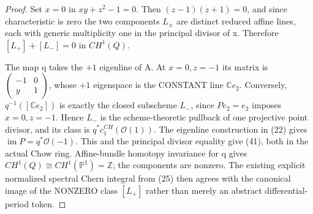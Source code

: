 \documentclass[11pt]{article}
\begin{document}
\begin{proof}
Set $x=0$ in $xy+z^2-1=0$.
Then $(z-1)(z+1)=0$, and since characteristic
is zero the two components $L_\pm$ are distinct
reduced affine lines, each with generic
multiplicity one in the principal divisor
of x. Therefore $[L_+]+[L_-]=0$
in $CH^1(Q)$.

The map q takes the $+1$ eigenline of A.
At $x=0,z=-1$ its matrix is
$\begin{pmatrix}-1&0\\y&1\end{pmatrix}$,
whose $+1$ eigenspace is the CONSTANT line
$\mathbb C e_2$. Conversely,
$q^{-1}([\mathbb C e_2])$ is exactly the
closed subscheme $L_-$, since
$P e_2=e_2$ imposes $x=0,z=-1$.
Hence $L_-$ is the scheme-theoretic
pullback of one projective point divisor,
and its class is $q^*c_1^{CH}(\mathcal O(1))$.
The eigenline construction in (22) gives
$\operatorname{im}P=q^*\mathcal O(-1)$.
This and the principal divisor equality
give (41), both in the actual Chow ring.
Affine-bundle homotopy invariance for q
gives $CH^1(Q)\cong CH^1(\mathbb P^1)
=\mathbb Z$; the components are nonzero.
The existing explicit normalized spectral
Chern integral from (25) then agrees with
the canonical image of the NONZERO class
$[L_+]$ rather than merely an abstract
differential-period token.
\end{proof}
\end{document}
